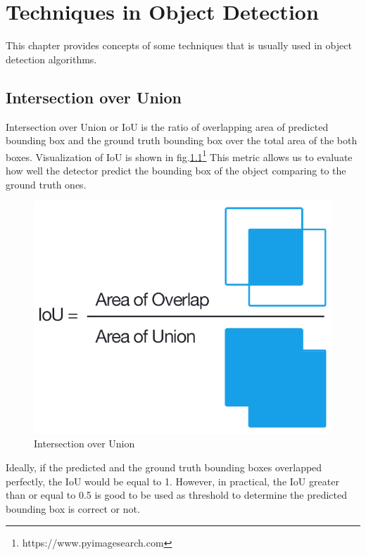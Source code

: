 \chapter{Techniques in Object Detection}
\hspace{0.45cm} This chapter provides concepts of some techniques that is usually used in object detection algorithms.
\section{Intersection over Union}
\hspace{0.45cm}Intersection over Union or \acrshort{IoU} is the ratio of overlapping area of predicted bounding box and the ground truth bounding box over the total area of the both boxes.
Visualization of \acrshort{IoU} is shown in fig.\ref{fig:iou}\footnote{https://www.pyimagesearch.com}
This metric allows us to evaluate how well the detector predict the bounding box of the object comparing to the ground truth ones.
\begin{figure}[h!]
    \centering
    \includegraphics[scale=0.5]{Chapters/Fig/iou.png}
    \caption{Intersection over Union}
    \label{fig:iou}
\end{figure}\par

Ideally, if the predicted and the ground truth bounding boxes overlapped perfectly, the \acrshort{IoU} would be equal to 1. However, in practical, the \acrshort{IoU} greater than or equal to 0.5 is good to be used as threshold to determine the predicted bounding box is correct or not.
